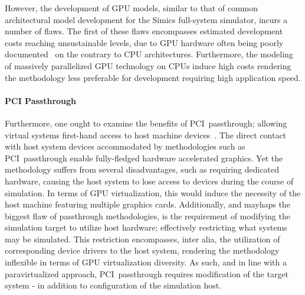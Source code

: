 However, the development of GPU models, similar to that of common architectural model development for the Simics full-system simulator, incurs a number of flaws.
The first of these flaws encompasses estimated development costs reaching unsustainable levels, due to GPU hardware often being poorly documented~ on the contrary to CPU architectures.
Furthermore, the modeling of massively parallelized GPU technology on CPUs induce high costs rendering the methodology less preferable for development requiring high application speed.

\paragraph{PCI Passthrough}
\label{par:backgroundandrelatedwork_graphicsvirtualization_pcipassthrough}
Furthermore, one ought to examine the benefits of PCI~passthrough; allowing virtual systems first-hand access to host machine devices~.
The direct contact with host system devices accommodated by methodologies such as PCI~passthrough enable fully-fledged hardware accelerated graphics.
Yet the methodology suffers from several disadvantages, such as requiring dedicated hardware, causing the host system to lose access to devices during the course of simulation.
In terms of GPU virtualization, this would induce the necessity of the host machine featuring multiple graphics cards.
Additionally, and mayhaps the biggest flaw of passthrough methodologies, is the requirement of modifying the simulation target to utilize host hardware; effectively restricting what systems may be simulated.
This restriction encompasses, inter alia, the utilization of corresponding device drivers to the host system, rendering the methodology inflexible in terms of GPU virtualization diversity.
As such, and in line with a paravirtualized approach, PCI~passthrough requires modification of the target system - in addition to configuration of the simulation host.


